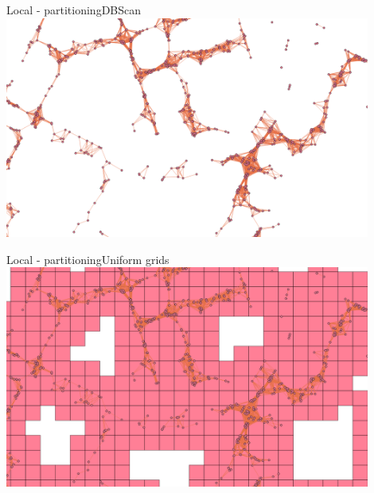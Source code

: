 \documentclass{beamer}
\begin{document}
\begin{frame}{Local - partitioning}{DBScan}
  \centering
  \includegraphics[width=0.9\textwidth]{figures/dbscan}
\end{frame}
\begin{frame}{Local - partitioning}{Uniform grids}
  \centering
  \includegraphics[width=0.9\textwidth]{figures/grids}
\end{frame}
\end{document}
